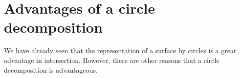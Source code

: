 


% 

\section{Advantages of a circle decomposition}
\label{advs}

We have already seen that the representation of a surface by circles
is a great advantage in intersection.
However, there are other reasons that a circle decomposition is advantageous.
